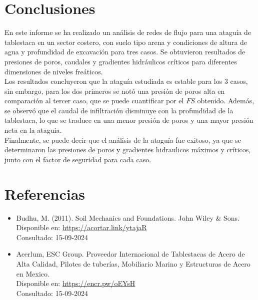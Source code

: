 \documentclass{article} %
\begin{document}
\newpage

\section{Conclusiones}

En este informe se ha realizado un análisis de redes de flujo para una ataguía de tablestaca en un sector costero, con suelo tipo arena y condiciones de altura de agua y profundidad de excavación para tres casos. Se obtuvieron resultados de presiones de poros, caudales y gradientes hidráulicos críticos para diferentes dimensiones de niveles freáticos.\\

Los resultados concluyeron que la ataguía estudiada es estable para los 3 casos, sin embargo, para los dos primeros se notó una presión de poros alta en comparación al tercer caso, que se puede cuantificar por el $FS$ obtenido. Además, se observó que el caudal de infiltración disminuye con la profundidad de la tablestaca, lo que se traduce en una menor presión de poros y una mayor presión neta en la ataguía.\\

Finalmente, se puede decir que el análisis de la ataguía fue exitoso, ya que se determinaron las presiones de poros y gradientes hidraulicos máximos y críticos, junto con el factor de seguridad para cada caso.

\newpage

\section{Referencias}

\begin{itemize}
    \item Budhu, M. (2011). Soil Mechanics and Foundations. John Wiley \& Sons.\\
    Disponible en: \url{https://acortar.link/ytajaR}
    \\
    Consultado: 15-09-2024\\
    \item Acerlum, ESC Group. Proveedor Internacional de Tablestacas de Acero de Alta Calidad, Pilotes de tuberías, Mobiliario Marino y Estructuras de Acero en Mexico.\\
    Disponible en: \url{https://encr.pw/oEYsH}
    \\
    Consultado: 15-09-2024
\end{itemize}

\newpage
\end{document}
